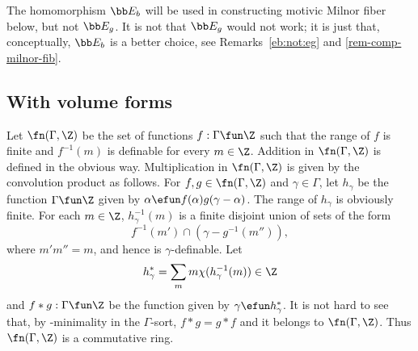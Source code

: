 The homomorphism $\bb E_b$ will be used in constructing motivic Milnor fiber below, but not $\bb E_g$. It is not that  $\bb E_g$ would not work; it is just that, conceptually, $\bb E_b$ is a better choice,  see Remarks~\ref{eb:not:eg} and \ref{rem-comp-milnor-fib}.




\subsection{With volume forms}
Let $\fn(\Gamma, \Z)$ be the set of functions $f: \Gamma \fun \Z$ such that the range of $f$ is finite and $f^{-1}(m)$ is definable for every $m \in \Z$. Addition in $\fn(\Gamma, \Z)$ is defined in the obvious way. Multiplication in $\fn(\Gamma, \Z)$ is given by the convolution product as follows. For $f, g \in \fn(\Gamma, \Z)$ and $\gamma \in \Gamma$, let $h_\gamma$ be the function $\Gamma \fun \Z$ given by $\alpha \efun f(\alpha)g(\gamma - \alpha)$. The range of $h_\gamma$ is obviously finite. For each $m \in \Z$, $h_\gamma^{-1}(m)$ is a finite disjoint union of sets of the form
\[
f^{-1}(m') \cap (\gamma - g^{-1}(m'')),
\]
where $m' m'' = m$, and hence is $\gamma$-definable. Let
\[
 h_\gamma^* = \sum_{m} m \chi(h_\gamma^{-1}(m)) \in \Z
\]
and $f * g : \Gamma \fun \Z$ be the function  given by $\gamma \efun h_\gamma^*$. It is not hard to see that, by \omin-minimality in the $\Gamma$-sort, $f * g = g * f$ and it belongs to $\fn(\Gamma, \Z)$. Thus $\fn(\Gamma, \Z)$ is a commutative ring.


